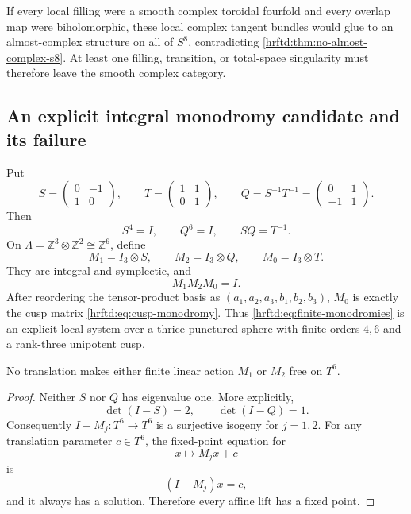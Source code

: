 If every local filling were a smooth complex toroidal fourfold and every
overlap map were biholomorphic, these local complex tangent bundles would glue
to an almost-complex structure on all of \(S^8\), contradicting
\cref{hrftd:thm:no-almost-complex-s8}.  At least one filling, transition, or
total-space singularity must therefore leave the smooth complex category.

\subsection{An explicit integral monodromy candidate and its failure}
\label{hrftd:finite-monodromy}

Put
\[
 S=
 \begin{pmatrix}0&-1\\1&0\end{pmatrix},
 \qquad
 T=
 \begin{pmatrix}1&1\\0&1\end{pmatrix},
 \qquad
 Q=S^{-1}T^{-1}
 =
 \begin{pmatrix}0&1\\-1&1\end{pmatrix}.
\]
Then
\begin{equation}
 S^4=I,\qquad Q^6=I,\qquad SQ=T^{-1}.
 \label{hrftd:eq:two-by-two-relations}
\end{equation}
On
\(\Lambda=\mathbb Z^3\otimes\mathbb Z^2\cong\mathbb Z^6\), define
\begin{equation}
 M_1=I_3\otimes S,\qquad
 M_2=I_3\otimes Q,\qquad
 M_0=I_3\otimes T.
 \label{hrftd:eq:finite-monodromies}
\end{equation}
They are integral and symplectic, and
\[
 M_1M_2M_0=I.
\]
After reordering the tensor-product basis as
\((a_1,a_2,a_3,b_1,b_2,b_3)\), \(M_0\) is exactly the cusp matrix
\eqref{hrftd:eq:cusp-monodromy}.  Thus
\eqref{hrftd:eq:finite-monodromies} is an explicit local system over a
thrice-punctured sphere with finite orders \(4,6\) and a rank-three
unipotent cusp.

\begin{proposition}
\label{hrftd:prop:finite-fixed-points}
No translation makes either finite linear action \(M_1\) or \(M_2\) free on
\(T^6\).
\end{proposition}

\begin{proof}
Neither \(S\) nor \(Q\) has eigenvalue one.  More explicitly,
\[
 \det(I-S)=2,\qquad \det(I-Q)=1.
\]
Consequently \(I-M_j:T^6\to T^6\) is a surjective isogeny for \(j=1,2\).
For any translation parameter \(c\in T^6\), the fixed-point equation for
\[
 x\longmapsto M_jx+c
\]
is
\[
 (I-M_j)x=c,
\]
and it always has a solution.  Therefore every affine lift has a fixed point.
\end{proof}

